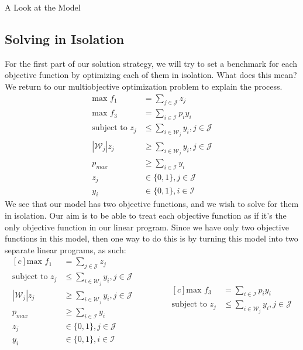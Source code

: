 \documentclass[12pt]{pom_thesis}
\theoremstyle{definition}
\begin{document}
\begin{chapter}{A Look at the Model}
\subsection{Solving in Isolation}

	For the first part of our solution strategy, we will try to set a benchmark for each objective function by optimizing each of them in isolation. What does this mean? We return to our multiobjective optimization problem to explain the process.
	\begin{align*}
	\textrm{max } f_1 &= \sum_{j \in \mathcal{J}} z_j \\
	\textrm{max } f_3 &= \sum_{i \in \mathcal{I}} p_iy_i \\
	\textrm{subject to } z_j &\leq \sum_{i \in \mathcal{W}_j} y_i, j \in \mathcal{J}\\
	\left|\mathcal{W}_j\right|z_j &\geq \sum_{i \in \mathcal{W}_j} y_i, j \in \mathcal{J} \\
	p_{max} &\geq \sum_{i \in \mathcal{I}}y_i \\
	z_j &\in \{0,1\}, j \in \mathcal{J} \\
	y_i &\in \{0,1\}, i \in \mathcal{I}
	\end{align*}
We see that our model has two objective functions, and we wish to solve for them in isolation. Our aim is to be able to treat each objective function as if it's the only objective function in our linear program. Since we have only two objective functions in this model, then one way to do this is by turning this model into two separate linear programs, as such:
\begin{equation*}
\begin{aligned}[c]
\textrm{max } f_1 &= \sum_{j \in \mathcal{J}} z_j \\
\textrm{subject to } z_j &\leq \sum_{i \in \mathcal{W}_j} y_i, j \in \mathcal{J}\\
\left|\mathcal{W}_j\right|z_j &\geq \sum_{i \in \mathcal{W}_j} y_i, j \in \mathcal{J} \\
p_{max} &\geq \sum_{i \in \mathcal{I}} y_i  \\
z_j &\in \{0,1\}, j \in \mathcal{J} \\
y_i &\in \{0,1\}, i \in \mathcal{I}
\end{aligned}
\qquad \qquad
\begin{aligned}[c]
\textrm{max } f_3 &= \sum_{i \in \mathcal{I}} p_iy_i \\
\textrm{subject to } z_j &\leq \sum_{i \in \mathcal{W}_j} y_i, j \in \mathcal{J}\\

\end{aligned}
\end{equation*}
\end{chapter}
\end{document}
